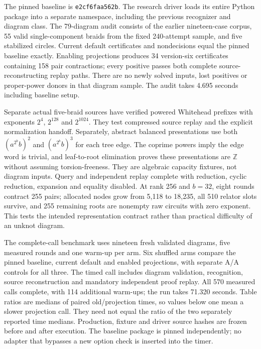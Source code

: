 The pinned baseline is \texttt{e2cf6faa562b}. The research driver loads its
entire Python package into a separate namespace, including the previous
recognizer and diagram class. The 79-diagram audit consists of the earlier
nineteen-case corpus, 55 valid single-component braids from the fixed
240-attempt sample, and five stabilized circles. Current default certificates
and nondecisions equal the pinned baseline exactly. Enabling projections
produces 34 version-six certificates containing 158 pair contractions;
every positive passes both complete source-reconstructing replay paths.
There are no newly solved inputs, lost positives or proper-power donors in
that diagram sample. The audit takes 4.695 seconds including baseline setup.

Separate actual five-braid sources have verified powered Whitehead prefixes
with exponents $2^4$, $2^{128}$ and $2^{1024}$. They test compressed source
replay and the explicit normalization handoff. Separately, abstract balanced
presentations use both $(a^{2^b}b)^2$ and $(a^{2^b}b)^3$ for each tree edge.
The coprime powers imply the edge word is trivial, and leaf-to-root
elimination proves these presentations are $\mathbb Z$ without assuming
torsion-freeness. They are algebraic capacity fixtures, not diagram inputs.
Query and independent replay complete with reduction, cyclic reduction,
expansion and equality disabled. At rank 256 and $b=32$, eight rounds
contract 255 pairs; allocated nodes grow from 5,118 to 18,235, all 510
relator slots survive, and 255 remaining roots are nonempty raw circuits
with zero exponent. This tests the intended representation contract rather
than practical difficulty of an unknot diagram.



The complete-call benchmark uses nineteen fresh validated diagrams, five
measured rounds and one warm-up per arm. Six shuffled arms compare the
pinned baseline, current default and enabled projections, with separate
A/A controls for all three. The timed call includes diagram validation,
recognition, source reconstruction and mandatory independent proof replay.
All 570 measured calls complete, with 114 additional warm-ups; the run
takes 71.320 seconds. Table ratios are medians of paired old/projection
times, so values below one mean a slower projection call. They need not
equal the ratio of the two separately reported time medians. Production, fixture and driver source hashes are frozen
before and after execution. The baseline package is pinned independently;
no adapter that bypasses a new option check is inserted into the timer.

